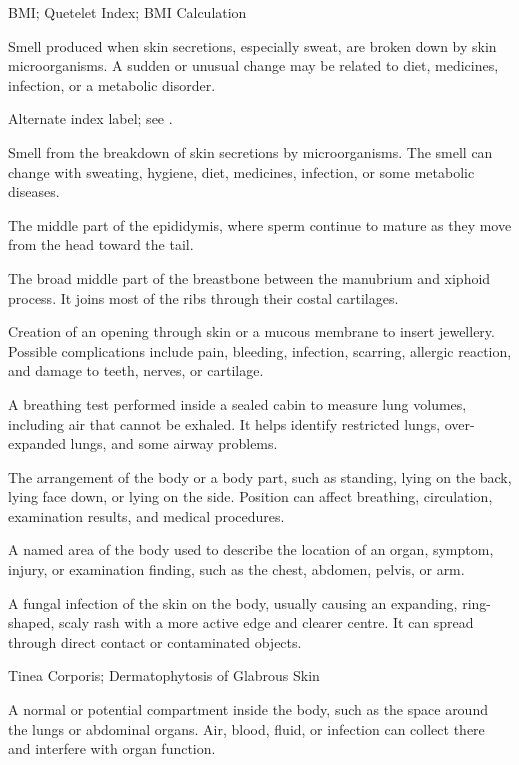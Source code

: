 \synonyms
BMI; Quetelet Index; BMI Calculation

 Smell produced when skin secretions, especially sweat, are broken down by skin microorganisms. A sudden or unusual change may be related to diet, medicines, infection, or a metabolic disorder.

 Alternate index label; see .

 Smell from the breakdown of skin secretions by microorganisms. The smell can change with sweating, hygiene, diet, medicines, infection, or some metabolic diseases.

 The middle part of the epididymis, where sperm continue to mature as they move from the head toward the tail.

 The broad middle part of the breastbone between the manubrium and xiphoid process. It joins most of the ribs through their costal cartilages.

 Creation of an opening through skin or a mucous membrane to insert jewellery. Possible complications include pain, bleeding, infection, scarring, allergic reaction, and damage to teeth, nerves, or cartilage.

 A breathing test performed inside a sealed cabin to measure lung volumes, including air that cannot be exhaled. It helps identify restricted lungs, over-expanded lungs, and some airway problems.

 The arrangement of the body or a body part, such as standing, lying on the back, lying face down, or lying on the side. Position can affect breathing, circulation, examination results, and medical procedures.

 A named area of the body used to describe the location of an organ, symptom, injury, or examination finding, such as the chest, abdomen, pelvis, or arm.

 A fungal infection of the skin on the body, usually causing an expanding, ring-shaped, scaly rash with a more active edge and clearer centre. It can spread through direct contact or contaminated objects.

\synonyms
Tinea Corporis; Dermatophytosis of Glabrous Skin

 A normal or potential compartment inside the body, such as the space around the lungs or abdominal organs. Air, blood, fluid, or infection can collect there and interfere with organ function.

